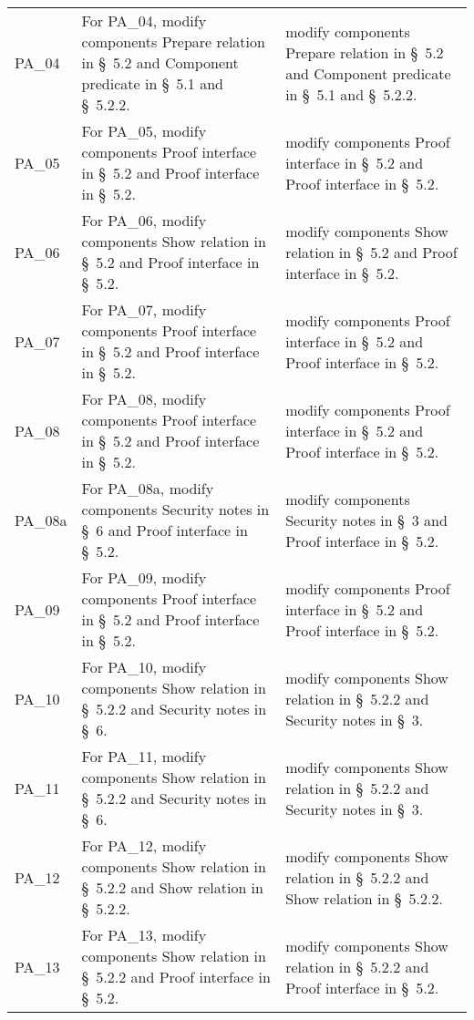 \begin{landscape}
\begin{longtable}{p{3cm} p{10cm} p{7cm}}
PA\_04 &
For PA\_04, modify components Prepare relation in \S~5.2 and Component predicate in \S~5.1 and \S~5.2.2. &
modify components Prepare relation in \S~5.2 and Component predicate in \S~5.1 and \S~5.2.2. \\

PA\_05 &
For PA\_05, modify components Proof interface in \S~5.2 and Proof interface in \S~5.2. &
modify components Proof interface in \S~5.2 and Proof interface in \S~5.2. \\

PA\_06 &
For PA\_06, modify components Show relation in \S~5.2 and Proof interface in \S~5.2. &
modify components Show relation in \S~5.2 and Proof interface in \S~5.2. \\

PA\_07 &
For PA\_07, modify components Proof interface in \S~5.2 and Proof interface in \S~5.2. &
modify components Proof interface in \S~5.2 and Proof interface in \S~5.2. \\

PA\_08 &
For PA\_08, modify components Proof interface in \S~5.2 and Proof interface in \S~5.2. &
modify components Proof interface in \S~5.2 and Proof interface in \S~5.2. \\

PA\_08a &
For PA\_08a, modify components Security notes in \S~6 and Proof interface in \S~5.2. &
modify components Security notes in \S~3 and Proof interface in \S~5.2. \\

PA\_09 &
For PA\_09, modify components Proof interface in \S~5.2 and Proof interface in \S~5.2. &
modify components Proof interface in \S~5.2 and Proof interface in \S~5.2. \\

PA\_10 &
For PA\_10, modify components Show relation in \S~5.2.2 and Security notes in \S~6. &
modify components Show relation in \S~5.2.2 and Security notes in \S~3. \\

PA\_11 &
For PA\_11, modify components Show relation in \S~5.2.2 and Security notes in \S~6. &
modify components Show relation in \S~5.2.2 and Security notes in \S~3. \\

PA\_12 &
For PA\_12, modify components Show relation in \S~5.2.2 and Show relation in \S~5.2.2. &
modify components Show relation in \S~5.2.2 and Show relation in \S~5.2.2. \\

PA\_13 &
For PA\_13, modify components Show relation in \S~5.2.2 and Proof interface in \S~5.2. &
modify components Show relation in \S~5.2.2 and Proof interface in \S~5.2. \\


\end{longtable}
\end{landscape}

